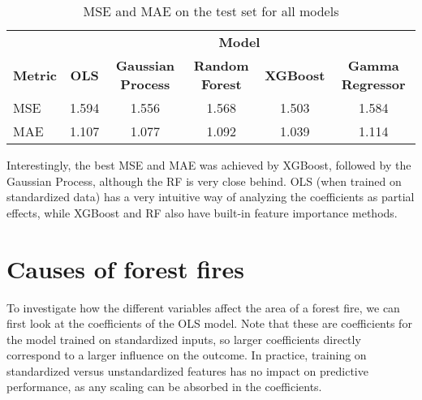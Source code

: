 \documentclass{article}
\begin{document}
\begin{table}[!htbp]
\centering
\caption{MSE and MAE on the test set for all models}
\label{tab:msemae}
\begin{tabular}{lccccc}
\hline
                & \multicolumn{5}{c}{\textbf{Model}}                                                    \\ \cline{2-6} 
\textbf{Metric} & \textbf{OLS} & \textbf{Gaussian Process} & \textbf{Random Forest} & \textbf{XGBoost} & \textbf{Gamma Regressor} \\ \hline
MSE             & 1.594        & 1.556                     & 1.568                   & 1.503     & 1.584       \\
MAE             & 1.107        & 1.077                     & 1.092                   & 1.039     & 1.114      \\ \hline
\end{tabular}
\end{table}

Interestingly, the best MSE and MAE was achieved by XGBoost, followed by the Gaussian Process, although the RF is very close behind. OLS (when trained on standardized data) has a very intuitive way of analyzing the coefficients as partial effects, while XGBoost and RF also have built-in feature importance methods.

\section{Causes of forest fires}
To investigate how the different variables affect the area of a forest fire, we can first look at the coefficients of the OLS model. Note that these are coefficients for the model trained on standardized inputs, so larger coefficients directly correspond to a larger influence on the outcome. In practice, training on standardized versus unstandardized features has no impact on predictive performance, as any scaling can be absorbed in the coefficients.
\end{document}
